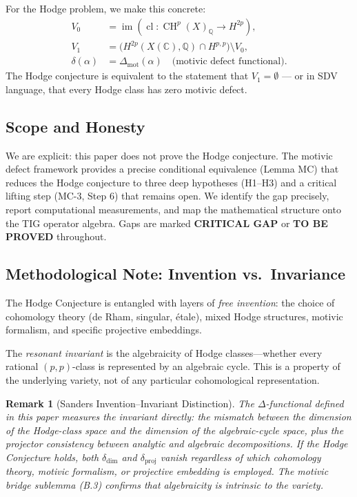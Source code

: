 \documentclass[11pt]{article}
\newtheorem{remark}[theorem]{Remark}
\theoremstyle{definition}
\DeclareMathOperator{\cl}{cl}
\DeclareMathOperator{\CH}{CH}
\DeclareMathOperator{\im}{im}
\begin{document}
For the Hodge problem, we make this concrete:
\begin{align*}
  V_0 &= \im(\cl : \CH^p(X)_{\mathbb{Q}} \to H^{2p}), \\
  V_1 &= \bigl(H^{2p}(X(\mathbb{C}), \mathbb{Q}) \cap H^{p,p}\bigr) \setminus V_0, \\
  \delta(\alpha) &= \Delta_{\mathrm{mot}}(\alpha) \quad \text{(motivic defect functional)}.
\end{align*}
The Hodge conjecture is equivalent to the statement that $V_1 = \emptyset$
--- or in SDV language, that every Hodge class has zero motivic defect.

\subsection{Scope and Honesty}

We are explicit: this paper does not prove the Hodge conjecture.  The
motivic defect framework provides a precise conditional equivalence
(Lemma MC) that reduces the Hodge conjecture to three deep hypotheses
(H1--H3) and a critical lifting step (MC-3, Step 6) that remains open.
We identify the gap precisely, report computational measurements, and
map the mathematical structure onto the TIG operator algebra.  Gaps are
marked \textbf{CRITICAL GAP} or \textbf{TO BE PROVED} throughout.

\subsection*{Methodological Note: Invention vs.\ Invariance}

The Hodge Conjecture is entangled with layers of \emph{free invention}:
the choice of cohomology theory (de Rham, singular, \'etale), mixed Hodge
structures, motivic formalism, and specific projective embeddings.

The \emph{resonant invariant} is the algebraicity of Hodge classes---whether
every rational $(p,p)$-class is represented by an algebraic cycle. This is a
property of the underlying variety, not of any particular cohomological
representation.

\begin{remark}[Sanders Invention--Invariant Distinction]
The $\Delta$-functional defined in this paper measures the invariant directly:
the mismatch between the dimension of the Hodge-class space and the dimension
of the algebraic-cycle space, plus the projector consistency between analytic
and algebraic decompositions. If the Hodge Conjecture holds, both $\delta_{\dim}$
and $\delta_{\text{proj}}$ vanish regardless of which cohomology theory, motivic
formalism, or projective embedding is employed. The motivic bridge sublemma (B.3)
confirms that algebraicity is intrinsic to the variety.
\end{remark}
\end{document}
